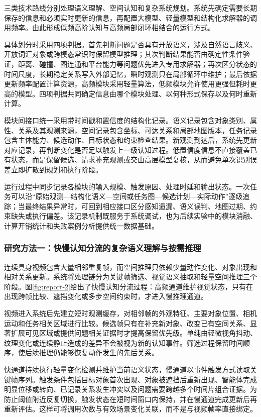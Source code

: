 三类技术路线分别处理语义理解、空间认知和复杂系统规划。系统先确定需要长期保存的信息和必须实时更新的信息，再配置大模型、轻量模型和结构化求解器的调用频率。由此形成低频高阶认知与高频局部闭环相结合的运行方式。

具体划分时采用四项判据。首先判断问题是否具有开放语义，涉及自然语言歧义、开放词汇对象或跨模态常识时保留模型推理；其次判断结果能否由确定性条件验证，距离、碰撞、图连通和平台能力等问题优先进入专用求解器；再次区分状态的时间尺度，长期稳定关系写入外部记忆，瞬时观测只在局部循环中维护；最后依据更新频率配置计算资源，高频模块采用轻量算法，低频模块允许使用更强但耗时更高的模型。四项判据共同确定信息由哪个模块处理、以何种形式保存以及何时重新计算。

模块间接口统一采用带时间戳和置信度的结构化记录。语义记录包含对象类别、属性、关系及其观测来源，空间记录包含坐标、可达关系和局部地图版本，任务记录包含主体能力、候选动作、目标状态和约束检查结果。新观测到达后，系统先更新对应记录，再判断变化是否足以触发上一级认知过程。低置信度信息不直接覆盖已有状态，而是保留候选、请求补充观测或交由高层模型复核，从而避免单次识别误差立即扩散到规划和执行阶段。

运行过程中同步记录各模块的输入规模、触发原因、处理时延和输出状态。一次任务可以沿“原始观测—结构化语义—空间或任务图—候选计划—实际动作”逐级追踪；当最终结果异常时，可回到相应接口区分感知遗漏、语义误判、地图过期、约束缺失或执行偏差。该记录机制既服务于系统调试，也为后续实验中的模块消融、计算开销统计和失败案例分析提供统一数据基础。

\subsubsection{研究方法一：快慢认知分流的复杂语义理解与按需推理}
连续具身视频包含大量相邻重复帧，而空间推理只依赖少量动作变化、对象出现和相对关系更新。系统将处理链分为关键帧筛选、视觉语义抽取和轻量空间推理三个阶段。图\ref{fig:report-2}给出了快慢认知分流过程：高频通道维护视觉状态，只有在出现跨帧比较、遮挡变化或多步空间约束时，才进入慢推理通道。

视频进入系统后先建立短时观测缓存，对相邻帧的外观特征、主要对象位置、相机运动和任务相关区域进行比较。候选帧只有在补充新对象、改变已有空间关系、显著扩展可见区域或提供问题相关证据时才提高保留优先级。单纯由轻微视角抖动、纹理变化或连续静止造成的差异不会被视为新的认知事件。筛选过程保留时间顺序，使后续推理仍能够恢复动作发生的先后关系。

快通道持续执行轻量变化检测并维护当前语义状态，慢通道以事件触发方式读取关键帧序列。触发条件包括目标对象首次出现、对象被遮挡后重新出现、智能体完成明显位移或转向、已记录关系发生冲突以及问题需要跨越多个时间片组合证据。为防止阈值附近反复切换，触发状态在短时间窗口内保持，并在慢通道完成更新后再重新评估。这样可将调用次数与有效场景变化关联，而不是与视频帧率直接绑定。

